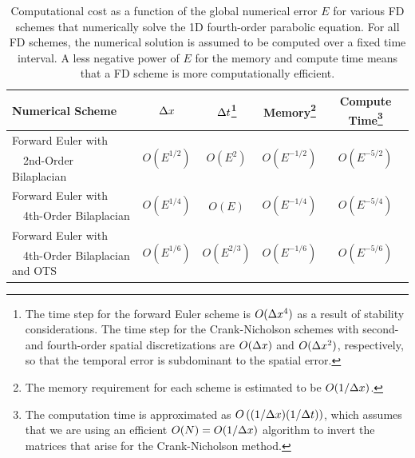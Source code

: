 \documentclass[oneeqnum,onefignum,onetabnum,onethmnum]{siamltex}
\begin{document}
\begin{table}[tbh]
\caption{\label{tab:comp_perf_vs_err_4th_order_parabolic} 
   Computational cost as a function of the global numerical error $E$
   for various FD schemes that numerically solve the 1D fourth-order
   parabolic equation.  For all FD schemes, the numerical solution is 
   assumed to be computed over a fixed time interval.  A less negative 
   power of $E$ for the memory and compute time means that a FD scheme is 
   more computationally efficient.
}
\begin{minipage}{\textwidth}
\begin{center} \footnotesize
\renewcommand{\arraystretch}{1.3}
\begin{tabular}{|l|c|c|c|c|}
  \hline
  {\bf Numerical Scheme} & $\Delta x$ 
  & $\Delta t$\footnote{The time step for the forward Euler scheme is $O(\Delta x^4)$
   as a result of stability considerations.  The time step for the 
   Crank-Nicholson schemes with second- and fourth-order spatial 
   discretizations are $O(\Delta x)$ and $O(\Delta x^2)$, respectively, so that the 
   temporal error is subdominant to the spatial error.}
  & {\bf Memory}\footnote{The memory requirement for each scheme is estimated 
    to be $O(1/\Delta x)$.} 
  & {\bf Compute Time}\footnote{The computation time is approximated as 
    $O\left( (1/\Delta x) (1/\Delta t) \right)$, which assumes that we are using an 
    efficient $O(N) = O(1/\Delta x)$ algorithm to invert the matrices that 
    arise for the Crank-Nicholson method.}  \\
  \hline 
  Forward Euler with 
    & \multirow{2}{*}{$O\left( E^{1/2} \right)$} 
    & \multirow{2}{*}{$O\left (E^{2} \right)$}
    & \multirow{2}{*}{$O\left( E^{-1/2} \right)$} 
    & \multirow{2}{*}{$O\left( E^{-5/2} \right)$} \\
  \ \ 2nd-Order Bilaplacian & & & & \\
  \hline 
  Forward Euler with 
    & \multirow{2}{*}{$O\left( E^{1/4} \right)$}
    & \multirow{2}{*}{$O\left (E \right)$}
    & \multirow{2}{*}{$O\left( E^{-1/4} \right)$} 
    & \multirow{2}{*}{$O\left( E^{-{5/4}} \right)$} \\
  \ \ 4th-Order Bilaplacian & & & & \\
  \hline 
  Forward Euler with 
    & \multirow{2}{*}{$O\left( E^{1/6} \right)$} 
    & \multirow{2}{*}{$O\left( E^{2/3} \right)$} 
    & \multirow{2}{*}{$O\left( E^{-1/6} \right)$} 
    & \multirow{2}{*}{$O\left( E^{-5/6} \right)$} \\ 
  \ \ 4th-Order Bilaplacian and OTS & & & & \\

\end{tabular}
\end{center}
\end{minipage}
\end{table}
\end{document}
